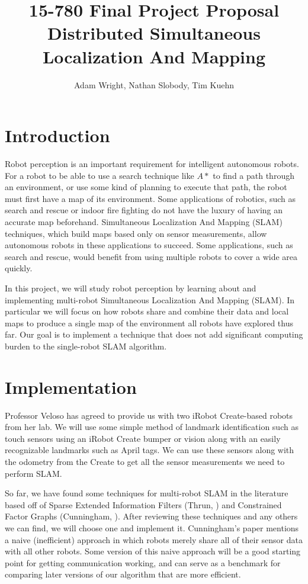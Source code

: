 \documentclass[11pt]{article}
\title{
15-780 Final Project Proposal \\ 
Distributed Simultaneous Localization And Mapping \\
}
\author{Adam Wright, Nathan Slobody, Tim Kuehn}
\begin{document}
\maketitle

\section{Introduction}

Robot perception is an important requirement for intelligent autonomous robots. For a robot to be able to use a search technique like $A*$ to find a path through an environment, or use some kind of planning to execute that path, the robot must first have a map of its environment. Some applications of robotics, such as search and rescue or indoor fire fighting do not have the luxury of having an accurate map beforehand. Simultaneous Localization And Mapping (SLAM) techniques, which build maps based only on sensor measurements, allow autonomous robots in these applications to succeed. Some applications, such as search and rescue, would benefit from using multiple robots to cover a wide area quickly. 

In this project, we will study robot perception by learning about and implementing multi-robot Simultaneous Localization And Mapping (SLAM). In particular we will focus on how robots share and combine their data and local maps to produce a single map of the environment all robots have explored thus far. Our goal is to implement a technique that does not add significant computing burden to the single-robot SLAM algorithm.

\section{Implementation}

Professor Veloso has agreed to provide us with two iRobot Create-based robots from her lab. We will use some simple method of landmark identification such as touch sensors using an iRobot Create bumper or vision along with an easily recognizable landmarks such as April tags. We can use these sensors along with the odometry from the Create to get all the sensor measurements we need to perform SLAM. 

So far, we have found some techniques for multi-robot SLAM in the literature based off of Sparse Extended Information Filters (Thrun, \cite{thrun2003}) and Constrained Factor Graphs (Cunningham, \cite{cunningham2010}). After reviewing these techniques and any others we can find, we will choose one and implement it. Cunningham's paper mentions a naive (inefficient) approach in which robots merely share all of their sensor data with all other robots. Some version of this naive approach will be a good starting point for getting communication working, and can serve as a benchmark for comparing later versions of our algorithm that are more efficient.
\end{document}
